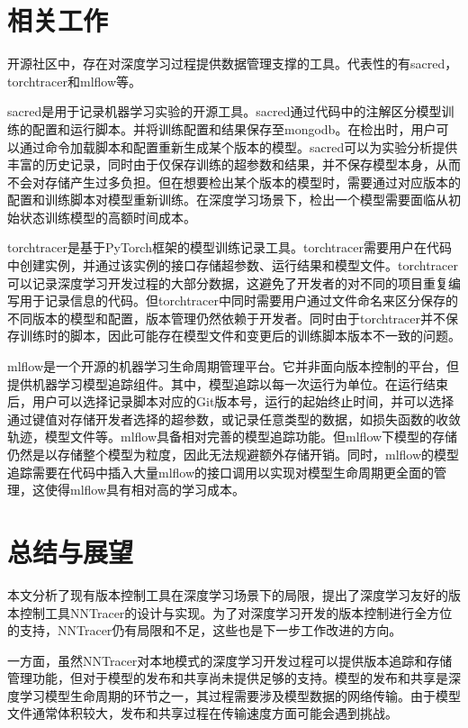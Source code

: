 \documentclass{cjc}
\begin{document}
\section{相关工作}

开源社区中，存在对深度学习过程提供数据管理支撑的工具。代表性的有sacred，torchtracer和mlflow等。

sacred是用于记录机器学习实验的开源工具。sacred通过代码中的注解区分模型训练的配置和运行脚本。并将训练配置和结果保存至mongodb。在检出时，用户可以通过命令加载脚本和配置重新生成某个版本的模型。sacred可以为实验分析提供丰富的历史记录，同时由于仅保存训练的超参数和结果，并不保存模型本身，从而不会对存储产生过多负担。但在想要检出某个版本的模型时，需要通过对应版本的配置和训练脚本对模型重新训练。在深度学习场景下，检出一个模型需要面临从初始状态训练模型的高额时间成本。

torchtracer是基于PyTorch框架的模型训练记录工具。torchtracer需要用户在代码中创建实例，并通过该实例的接口存储超参数、运行结果和模型文件。torchtracer可以记录深度学习开发过程的大部分数据，这避免了开发者的对不同的项目重复编写用于记录信息的代码。但torchtracer中同时需要用户通过文件命名来区分保存的不同版本的模型和配置，版本管理仍然依赖于开发者。同时由于torchtracer并不保存训练时的脚本，因此可能存在模型文件和变更后的训练脚本版本不一致的问题。

mlflow是一个开源的机器学习生命周期管理平台。它并非面向版本控制的平台，但提供机器学习模型追踪组件。其中，模型追踪以每一次运行为单位。在运行结束后，用户可以选择记录脚本对应的Git版本号，运行的起始终止时间，并可以选择通过键值对存储开发者选择的超参数，或记录任意类型的数据，如损失函数的收敛轨迹，模型文件等。mlflow具备相对完善的模型追踪功能。但mlflow下模型的存储仍然是以存储整个模型为粒度，因此无法规避额外存储开销。同时，mlflow的模型追踪需要在代码中插入大量mlflow的接口调用以实现对模型生命周期更全面的管理，这使得mlflow具有相对高的学习成本。

\section{总结与展望}

本文分析了现有版本控制工具在深度学习场景下的局限，提出了深度学习友好的版本控制工具NNTracer的设计与实现。为了对深度学习开发的版本控制进行全方位的支持，NNTracer仍有局限和不足，这些也是下一步工作改进的方向。

一方面，虽然NNTracer对本地模式的深度学习开发过程可以提供版本追踪和存储管理功能，但对于模型的发布和共享尚未提供足够的支持。模型的发布和共享是深度学习模型生命周期的环节之一，其过程需要涉及模型数据的网络传输。由于模型文件通常体积较大，发布和共享过程在传输速度方面可能会遇到挑战。
\end{document}
